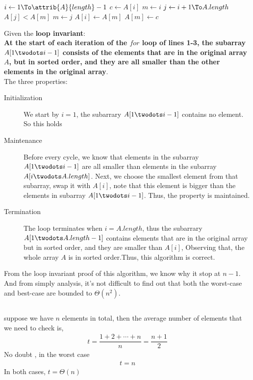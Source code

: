 \documentclass[paper=a4, fontsize=11pt,oneside]{book} %
\numberwithin{equation}{section} %
\numberwithin{figure}{section} %
\numberwithin{table}{section} %
\begin{document}
		\subsection{}
			\begin{codebox}
			\li \For $i \gets 1 \To \attrib{A}{length} - 1$
			\li \Do
					$c \gets A[i]$
			\li 	$m \gets i$
			\li  	\For $j \gets i + 1 \To A.length$
			\li		\Do
						\If $A[j] < A[m]$
			\li			\Do
							$m \gets j$
						\End
					\End
			\li		$A[i] \gets A[m]$
			\li		$A[m] \gets c$
				\End
			\End
			\end{codebox}
			Given the \textbf{loop invariant}:\\
			\textbf{At the start of each iteration of the $for$ loop of lines 1-3, the subarray
				$A[1 \twodots i - 1]$ consists of the elements that are in the original array $A$, but in sorted order, and they are all smaller than the other elements in the original array}.\\
			The three properties:
			\begin{description}
				\item[Initialization] We start by $i = 1$, the subarrary $A[1 \twodots i - 1]$ contains no element. So this holds
				\item[Maintenance] Before every cycle, we know that elements in the subarray $A[1 \twodots i - 1]$ are all smaller than elements in the subarray $A[i \twodots A.length]$. Next, we choose the smallest element from that subarray, swap it with $A[i]$, note that this element is bigger than the
				elements in subarray $A[1 \twodots i - 1]$. Thus, the property is maintained.
				\item[Termination] The loop terminates 
				when $i = A.length$, 
				thus the subarrary $A[1 \twodots A.length - 1]$ contains elements that are in the original array but in sorted order, and they are smaller than $A[i]$, 
				Observing that, the whole array $A$ is in sorted order.Thus, this algorithm is correct.
			\end{description}
			From the loop invariant proof of this algorithm, we know why it stop at $n-1$.
			And from simply analysis, it's not difficult to find out that both the worst-case 
			and best-case are bounded to $\Theta(n^2)$.
			
		\subsection{}
			suppose we have $n$ elements in total, then the average number of elements that we need to check is,
			\begin{align*}
			t = \dfrac{1 + 2 + \cdots + n}{n} = \dfrac{n+1}{2}
			\end{align*}
			No doubt , in the worst case
			\begin{align*}
			t = n
			\end{align*}
			In both cases, $t = \Theta(n)$
\end{document}
